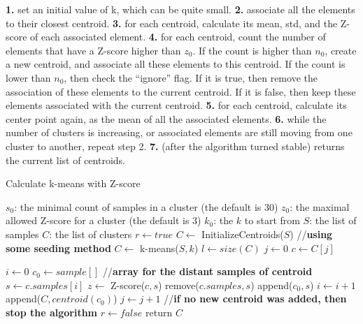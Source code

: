 \documentclass[12pt]{article}
\begin{document}
\textbf{1.} set an initial value of k, which can be quite small. \newline
\textbf{2.} associate all the elements to their closest centroid. \newline
\textbf{3.} for each centroid, calculate its mean, std, and the Z-score of each associated element. \newline
\textbf{4.} for each centroid, count the number of elements that have a Z-score higher than $z_0$. If the count is higher than $n_0$, create a new centroid, and associate all these elements to this centroid.
If the count is lower than $n_0$, then check the “ignore” flag. If it is true, then remove the association of these elements to the current centroid. If it is false, then keep these elements associated with the current centroid. \newline
\textbf{5.} for each centroid, calculate its center point again, as the mean of all the associated elements. \newline
\textbf{6.} while the number of clusters is increasing, or associated elements are still moving from one cluster to another, repeat step 2. \newline
\textbf{7.} (after the algorithm turned stable) returns the current list of centroids. \newline
\newpage
\begin{algorithm}
\caption{Calculate k-means with Z-score}
\begin{algorithmic} 
\REQUIRE
\STATE $s_0$: the minimal count of samples in a cluster (the default is 30)
\STATE $z_0$: the maximal allowed Z-score for a cluster (the default is 3)
\STATE $k_0$: the $k$ to start from
\STATE $S$: the list of samples
\ENSURE $C$: the list of clusters
\STATE $r \leftarrow true$
\newline
\STATE $C \leftarrow $ InitializeCentroids($S$) //\textbf{using some seeding method}
\STATE $C \leftarrow $ k-means($S, k$)
\STATE $l \leftarrow size(C)$
\STATE $j \leftarrow 0$
\STATE $c \leftarrow C[j]$

\STATE $i \leftarrow 0$
\STATE $c_0 \leftarrow sample[]$ //\textbf{array for the distant samples of centroid}
\STATE $s \leftarrow c.samples[i]$
\STATE $z \leftarrow $ Z-score($c,s$)
\STATE remove($c.samples,s$)
\STATE append($c_0,s$)
\ENDIF
\STATE $i \leftarrow i+1$
\ENDWHILE
{}
\STATE append($C,centroid(c_0)$)
\ENDIF
\STATE $j \leftarrow j+1$
\ENDWHILE
\newline
//\textbf{if no new centroid was added, then stop the algorithm}
\STATE $r \leftarrow false$
\ENDIF
\ENDWHILE
\STATE return $C$
\end{algorithmic}
\end{algorithm}
\end{document}
